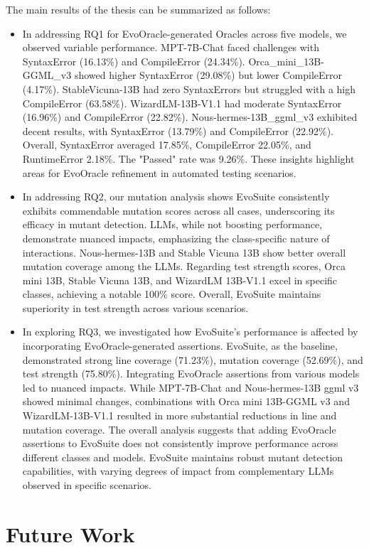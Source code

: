 The main results of the thesis can be summarized as follows:
\begin{itemize}
  \item In addressing RQ1 for EvoOracle-generated Oracles across five models, we observed variable performance. MPT-7B-Chat faced challenges with SyntaxError (16.13\%) and CompileError (24.34\%). Orca\_mini\_13B-GGML\_v3 showed higher SyntaxError (29.08\%) but lower CompileError (4.17\%). StableVicuna-13B had zero SyntaxErrors but struggled with a high CompileError (63.58\%). WizardLM-13B-V1.1 had moderate SyntaxError (16.96\%) and CompileError (22.82\%). Nous-hermes-13B\_ggml\_v3 exhibited decent results, with SyntaxError (13.79\%) and CompileError (22.92\%). Overall, SyntaxError averaged 17.85\%, CompileError 22.05\%, and RuntimeError 2.18\%. The "Passed" rate was 9.26\%. These insights highlight areas for EvoOracle refinement in automated testing scenarios.
  \item In addressing RQ2, our mutation analysis shows EvoSuite consistently exhibits commendable mutation scores across all cases, underscoring its efficacy in mutant detection. LLMs, while not boosting performance, demonstrate nuanced impacts, emphasizing the class-specific nature of interactions. Nous-hermes-13B and Stable Vicuna 13B show better overall mutation coverage among the LLMs. Regarding test strength scores, Orca mini 13B, Stable Vicuna 13B, and WizardLM 13B-V1.1 excel in specific classes, achieving a notable 100\% score. Overall, EvoSuite maintains superiority in test strength across various scenarios.
  \item In exploring RQ3, we investigated how EvoSuite's performance is affected by incorporating EvoOracle-generated assertions. EvoSuite, as the baseline, demonstrated strong line coverage (71.23\%), mutation coverage (52.69\%), and test strength (75.80\%). Integrating EvoOracle assertions from various models led to nuanced impacts. While MPT-7B-Chat and Nous-hermes-13B ggml v3 showed minimal changes, combinations with Orca mini 13B-GGML v3 and WizardLM-13B-V1.1 resulted in more substantial reductions in line and mutation coverage. The overall analysis suggests that adding EvoOracle assertions to EvoSuite does not consistently improve performance across different classes and models. EvoSuite maintains robust mutant detection capabilities, with varying degrees of impact from complementary LLMs observed in specific scenarios.
\end{itemize}

\section{Future Work}
\label{sec:future_work}
\vspace{0.2 cm}


